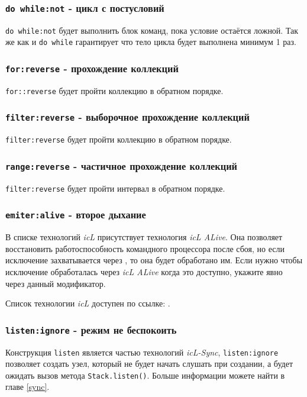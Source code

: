 \subsubsection{\lstinline|do while:not| - цикл с постусловий}

\lstinline|do while:not| будет выполнить блок команд, пока условие остаётся ложной. Так же как и \lstinline|do while| гарантирует что тело цикла будет выполнена минимум 1 раз.

\subsubsection{\lstinline|for:reverse| - прохождение коллекций}

\lstinline|for::reverse| будет пройти коллекцию в обратном порядке.

\subsubsection{\lstinline|filter:reverse| - выборочное прохождение коллекций}

\lstinline|filter:reverse| будет пройти коллекцию в обратном порядке.

\subsubsection{\lstinline|range:reverse| - частичное прохождение коллекций}

\lstinline|filter:reverse| будет пройти интервал в обратном порядке.

\subsubsection{\lstinline|emiter:alive| - второе дыхание}

В списке технологий \textit{icL} присутствует технология \textit{icL ALive}. Она позволяет восстановить работоспособность командного процессора после сбоя, но если исключение захватывается через , то она будет обработано им. Если нужно чтобы исключение обработалась через \textit{icL ALive} когда это доступно, укажите явно через данный модификатор.

Список технологии \textit{icL} доступен по ссылке: .

\subsubsection{\lstinline|listen:ignore| - режим не беспокоить}

Конструкция \lstinline|listen| является частью технологий \textit{icL-Sync}, \lstinline|listen:ignore| позволяет создать узел, который не будет начать слушать при создании, а будет ожидать вызов метода \lstinline|Stack.listen()|. Больше информации можете найти в главе \ref{sync}. 
